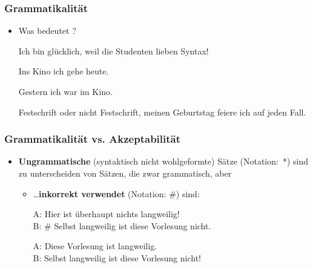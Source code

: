 
\begin{frame}
\frametitle{Grammatikalität}

\begin{itemize}
	
	\item Was bedeutet ?
	
	\ea Ich bin glücklich, weil die Studenten lieben Syntax!
	\z
	
	\ea Ins Kino ich gehe heute.
	\z
	
	\ea Gestern ich war im Kino.
	\z
	
	\ea Festschrift oder nicht Festschrift, meinen Geburtstag feiere ich auf jeden Fall. 
	\z
	
\nocite{Finkbeiner&Meibauer14a}
	
\end{itemize}

\end{frame}


\begin{frame}
\frametitle{Grammatikalität vs. Akzeptabilität}

\begin{itemize}
	\item \textbf{Ungrammatische} (syntaktisch nicht wohlgeformte) Sätze (Notation:~*) sind zu unterscheiden von Sätzen, die zwar grammatisch, aber
	
	\begin{itemize}
		\item \dots \textbf{inkorrekt verwendet} (Notation: \#) sind:

		\ea A: Hier ist überhaupt nichts langweilig!\\
		B: \# Selbst langweilig ist diese Vorlesung nicht.
		\z
\pause

		\ea A: Diese Vorlesung ist langweilig.\\
		B: Selbst langweilig ist diese Vorlesung nicht!
		\z
		
	\end{itemize}

\end{itemize}
\nocite{Coseriu88a, Fries15a, Repp&Co15a}
\end{frame}


